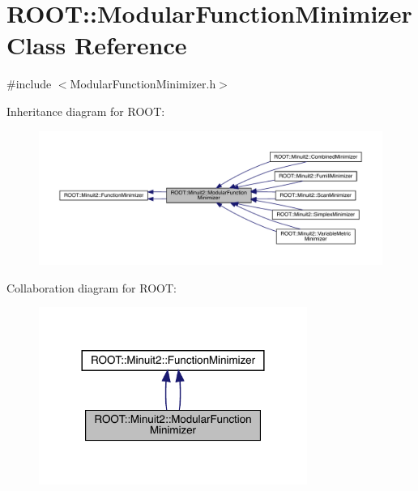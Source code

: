 \hypertarget{classROOT_1_1Minuit2_1_1ModularFunctionMinimizer}{}\section{R\+O\+OT\+:\+:Modular\+Function\+Minimizer Class Reference}
\label{classROOT_1_1Minuit2_1_1ModularFunctionMinimizer}


{\ttfamily \#include $<$Modular\+Function\+Minimizer.\+h$>$}



Inheritance diagram for R\+O\+OT\+:\nopagebreak
\begin{figure}[H]
\begin{center}
\leavevmode
\includegraphics[width=350pt]{da/d9e/classROOT_1_1Minuit2_1_1ModularFunctionMinimizer__inherit__graph}
\end{center}
\end{figure}


Collaboration diagram for R\+O\+OT\+:\nopagebreak
\begin{figure}[H]
\begin{center}
\leavevmode
\includegraphics[width=248pt]{dc/dfc/classROOT_1_1Minuit2_1_1ModularFunctionMinimizer__coll__graph}
\end{center}
\end{figure}

